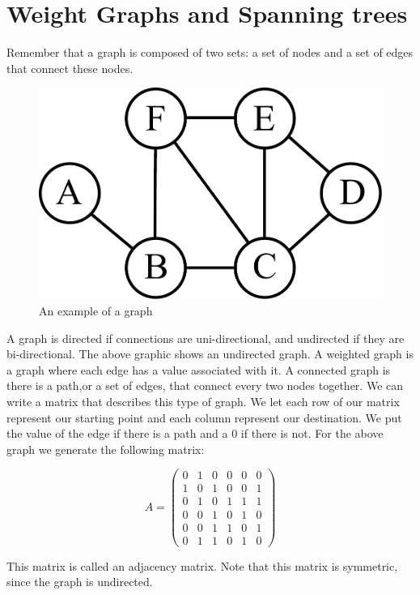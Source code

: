 \label{Ch:Kruskal}


\section*{Weight Graphs and Spanning trees}


Remember that a graph is composed of two sets: a set of nodes and a set of edges that connect these nodes. 

\begin{figure}[H]
\includegraphics[width = .4\textwidth]{graph1.pdf}
\caption{An example of a graph}
\end{figure}

A graph is directed if connections are uni-directional, and undirected if they are bi-directional.
The above graphic shows an undirected graph.
A weighted graph is a graph where each edge has a value associated with it.
A connected graph is there is a path,or a set of edges, that connect every two nodes together.
We can write a matrix that describes this type of graph.
We let each row of our matrix represent our starting point and each column represent our destination.
We put the value of the edge if there is a path and a 0 if there is not.
For the above graph we generate the following matrix:

\[
A = \begin{pmatrix}
0 & 1 & 0 & 0 & 0 & 0\\
1 & 0 & 1 & 0 & 0 & 1\\
0 & 1 & 0 & 1 & 1 & 1\\
0 & 0 & 1 & 0 & 1 & 0\\
0 & 0 & 1 & 1 & 0 & 1\\
0 & 1 & 1 & 0 & 1 & 0
\end{pmatrix}
\]

This matrix is called an adjacency matrix.
Note that this matrix is symmetric, since the graph is undirected. 

